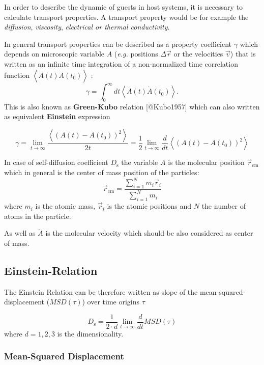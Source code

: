 \documentclass[
  letterpaper,
]{article}
\begin{document}

In order to describe the dynamic of guests in host systems, it is
necessary to calculate transport properties. A transport property would
be for example the \emph{diffusion}, \emph{viscosity}, \emph{electrical
or thermal conductivity}.

In general transport properties can be described as a property
coefficient \(\gamma\) which depends on microscopic variable \(A\)
(\emph{e.g.} positions \(\Delta \vec{r}\) or the velocities \(\vec{v}\))
that is written as an infinite time integration of a non-normalized time
correlation function \(\left < \dot{A}(t)\dot{A}(t_0) \right >\) : \[
\gamma = \int_{0}^{\infty} dt \left < \dot{A}(t)\dot{A}(t_0) \right >.
\] This is also known as \textbf{Green-Kubo} relation {[}@Kubo1957{]}
which can also written as equivalent \textbf{Einstein} expression

\[
\gamma = \lim_{t\to\infty} \frac{\left < (A(t) - A(t_0))^2 \right >}{2t} = \frac{1}{2} \lim_{t\to\infty} \frac{d}{dt} \left < (A(t) - A(t_0))^2 \right >
\]

In case of self-diffusion coefficient \(D_{\mathrm{s}}\) the variable
\(A\) is the molecular position \(\vec{r}_{\mathrm{cm}}\) which in
general is the center of mass position of the particles: \[
\vec{r}_{\mathrm{cm}} = \frac{\sum_{i=1}^{N} m_i \vec{r}_i}{\sum_{i=1}^{N} m_i}
\] where \(m_i\) is the atomic mass, \(\vec{r}_i\) is the atomic
positions and \(N\) the number of atoms in the particle.

As well as \(\dot{A}\) is the molecular velocity which should be also
considered as center of mass.

\hypertarget{einstein-relation-1}{%
\subsection*{Einstein-Relation}\label{einstein-relation-1}}


The Einstein Relation can be therefore written as slope of the
mean-squared-displacement (\(MSD(\tau)\)) over time origins \(\tau\)

\[
D_{\mathrm{s}} = \frac{1}{2 \cdot d} \lim _{t\to \infty} \frac{d}{dt} MSD(\tau)
\] where \(d=1,2,3\) is the dimensionality.

\hypertarget{mean-squared-displacement}{%
\subsubsection*{Mean-Squared
Displacement}\label{mean-squared-displacement}}
\end{document}
